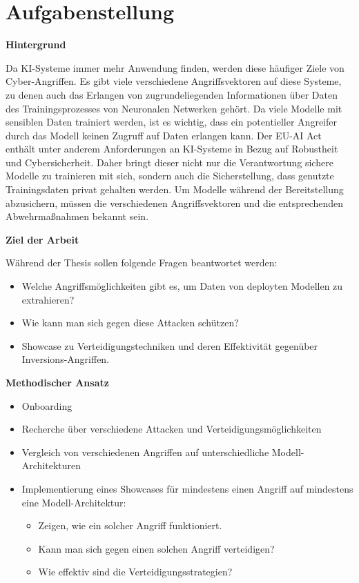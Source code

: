 \section{Aufgabenstellung} \label{chpt:Einleitung_Aufgabenstellung}

\textbf{Hintergrund}

Da KI-Systeme immer mehr Anwendung finden, werden diese häufiger Ziele von Cyber-Angriffen. Es gibt viele verschiedene Angriffsvektoren auf diese Systeme, zu denen auch das Erlangen von zugrundeliegenden Informationen über Daten des Trainingsprozesses von Neuronalen Netwerken gehört. Da viele Modelle mit sensiblen Daten trainiert werden, ist es wichtig, dass ein potentieller Angreifer durch das Modell keinen Zugruff auf Daten erlangen kann.
Der \glqq EU-AI Act\grqq{} enthält unter anderem Anforderungen an KI-Systeme in Bezug auf Robustheit und Cybersicherheit. Daher bringt dieser nicht nur die Verantwortung sichere Modelle zu trainieren mit sich, sondern auch die Sicherstellung, dass genutzte Trainingsdaten privat gehalten werden. Um Modelle während der Bereitstellung abzusichern, müssen die verschiedenen Angriffsvektoren und die entsprechenden Abwehrmaßnahmen bekannt sein.
\newline

\textbf{Ziel der Arbeit} 

Während der Thesis sollen folgende Fragen beantwortet werden:
\begin{itemize}
	\item Welche Angriffsmöglichkeiten gibt es, um Daten von deployten Modellen zu extrahieren?
	\item Wie kann man sich gegen diese Attacken schützen?
	\item Showcase zu Verteidigungstechniken und deren Effektivität gegenüber Inversions-Angriffen. \newline
\end{itemize}

\textbf{Methodischer Ansatz}

\begin{itemize}
	\item Onboarding
	\item Recherche über verschiedene Attacken und Verteidigungsmöglichkeiten
	\item Vergleich von verschiedenen Angriffen auf unterschiedliche Modell-Architekturen
	\item Implementierung eines Showcases für mindestens einen Angriff auf mindestens eine Modell-Architektur:
		\begin{itemize}
			\item Zeigen, wie ein solcher Angriff funktioniert.
			\item Kann man sich gegen einen solchen Angriff verteidigen?
			\item Wie effektiv sind die Verteidigungsstrategien? \newline
		\end{itemize}
\end{itemize}


